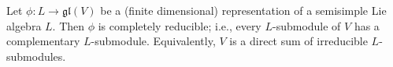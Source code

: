 Let $\phi: L \rightarrow \mathfrak{gl}(V)$ be a (finite dimensional) representation of a semisimple Lie algebra $L$. Then $\phi$ is completely reducible; i.e., every $L$-submodule of $V$ has a complementary $L$-submodule. Equivalently, $V$ is a direct sum of irreducible $L$-submodules.
